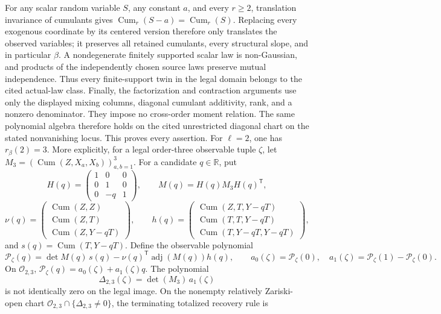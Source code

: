 For any scalar random variable \(S\), any constant \(a\), and every \(r\ge2\), translation invariance of cumulants gives \(\operatorname{Cum}_r(S-a)=\operatorname{Cum}_r(S)\).  Replacing every exogenous coordinate by its centered version therefore only translates the observed variables; it preserves all retained cumulants, every structural slope, and in particular \(\beta\).  A nondegenerate finitely supported scalar law is non-Gaussian, and products of the independently chosen source laws preserve mutual independence.  Thus every finite-support twin in the legal domain belongs to the cited actual-law class.  Finally, the factorization and contraction arguments use only the displayed mixing columns, diagonal cumulant additivity, rank, and a nonzero denominator.  They impose no cross-order moment relation.  The same polynomial algebra therefore holds on the cited unrestricted diagonal chart on the stated nonvanishing locus.  This proves every assertion.
For \(\ell=2\), one has \(r_\beta(2)=3\).  More explicitly, for a legal order-three observable tuple \(\zeta\), let \(M_3=(\operatorname{Cum}(Z,X_a,X_b))_{a,b=1}^3\).  For a candidate \(q\in\mathbb R\), put
\[
 H(q)=\begin{pmatrix}1&0&0\\0&1&0\\0&-q&1\end{pmatrix},
 \qquad M(q)=H(q)M_3H(q)^{\mathsf T},
\]
\[
 \nu(q)=\begin{pmatrix}
 \operatorname{Cum}(Z,Z)\\
 \operatorname{Cum}(Z,T)\\
 \operatorname{Cum}(Z,Y-qT)
 \end{pmatrix},\qquad
 h(q)=\begin{pmatrix}
 \operatorname{Cum}(Z,T,Y-qT)\\
 \operatorname{Cum}(T,T,Y-qT)\\
 \operatorname{Cum}(T,Y-qT,Y-qT)
 \end{pmatrix},
\]
and \(s(q)=\operatorname{Cum}(T,Y-qT)\).  Define the observable polynomial
\[
 \mathcal P_\zeta(q)=\det M(q)\,s(q)-\nu(q)^{\mathsf T}\operatorname{adj}(M(q))h(q),
 \qquad a_0(\zeta)=\mathcal P_\zeta(0),\quad
 a_1(\zeta)=\mathcal P_\zeta(1)-\mathcal P_\zeta(0).
\]
On \(\mathcal O_{2,3}\), \(\mathcal P_\zeta(q)=a_0(\zeta)+a_1(\zeta)q\).  The polynomial
\[
 \Delta_{2,3}(\zeta)=\det(M_3)\,a_1(\zeta)
\]
is not identically zero on the legal image.  On the nonempty relatively Zariski-open chart \(\mathcal O_{2,3}\cap\{\Delta_{2,3}\ne0\}\), the terminating totalized recovery rule is
